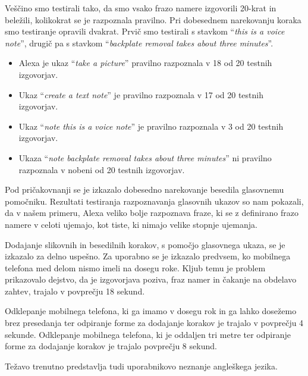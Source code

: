\documentclass[a4paper, 12pt]{book}
\begin{document}
Veščino smo testirali tako, da smo vsako frazo namere izgovorili 20-krat in beležili, kolikokrat se je razpoznala pravilno.
Pri dobesednem narekovanju koraka smo testiranje opravili dvakrat.
Prvič smo testirali s stavkom \enquote{\textit{this is a voice note}}, drugič pa s stavkom \enquote{\textit{backplate removal takes about three minutes}}.
\begin{itemize}
	\item Alexa je ukaz \enquote{\textit{take a picture}} pravilno razpoznala v 18 od 20 testnih izgovorjav.
	\item Ukaz \enquote{\textit{create a text note}} je pravilno razpoznala v 17 od 20 testnih izgovorjav.
	\item Ukaz \enquote{\textit{note this is a voice note}} je pravilno razpoznala v 3 od 20 testnih izgovorjav.
	\item Ukaza \enquote{\textit{note backplate removal takes about three minutes}} ni pravilno razpoznala v nobeni od 20 testnih izgovorjav.
\end{itemize}
Pod pričakovnanji se je izkazalo dobesedno narekovanje besedila glasovnemu pomočniku.
Rezultati testiranja razpoznavanja glasovnih ukazov so nam pokazali, da v našem primeru, Alexa veliko bolje razpoznava fraze, ki se z definirano frazo namere v celoti ujemajo, kot tiste, ki nimajo velike stopnje ujemanja.

Dodajanje slikovnih in besedilnih korakov, s pomočjo glasovnega ukaza, se je izkazalo za delno uspešno.
Za uporabno se je izkazalo predvsem, ko mobilnega telefona med delom nismo imeli na dosegu roke.
Kljub temu je problem prikazovalo dejstvo, da je izgovorjava poziva, fraz namer in čakanje na obdelavo zahtev, trajalo v povprečju 18 sekund.


Odklepanje mobilnega telefona, ki ga imamo v dosegu rok in ga lahko dosežemo brez presedanja ter odpiranje forme za dodajanje korakov je trajalo v povprečju 4 sekunde.
Odklepanje mobilnega telefona, ki je oddaljen tri metre ter odpiranje forme za dodajanje korakov je trajalo povprečju 8 sekund.

Težavo trenutno predstavlja tudi uporabnikovo neznanje angleškega jezika.

\end{document}
